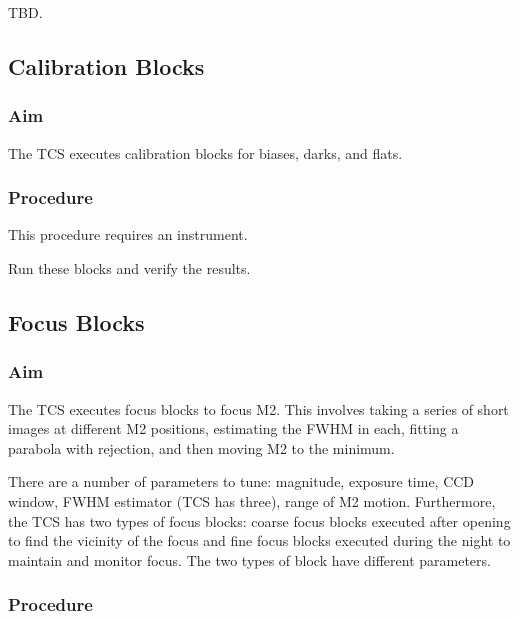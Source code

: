 \documentclass{article}
\begin{document}
TBD.


\subsection{Calibration Blocks}

\subsubsection{Aim}

The TCS executes calibration blocks for biases, darks, and flats.

\subsubsection{Procedure}

This procedure requires an instrument.

Run these blocks and verify the results.


\subsection{Focus Blocks}

\subsubsection{Aim}

The TCS executes focus blocks to focus M2. This involves taking a series of short images at different M2 positions, estimating the FWHM in each, fitting a parabola with rejection, and then moving M2 to the minimum.

There are a number of parameters to tune: magnitude, exposure time, CCD window, FWHM estimator (TCS has three), range of M2 motion. Furthermore, the TCS has two types of focus blocks: coarse focus blocks executed after opening to find the vicinity of the focus and fine focus blocks executed during the night to maintain and monitor focus. The two types of block have different parameters.

\subsubsection{Procedure}
\end{document}
